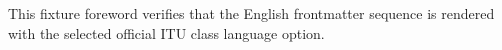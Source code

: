 This fixture foreword verifies that the English frontmatter sequence is rendered
with the selected official ITU class language option.
